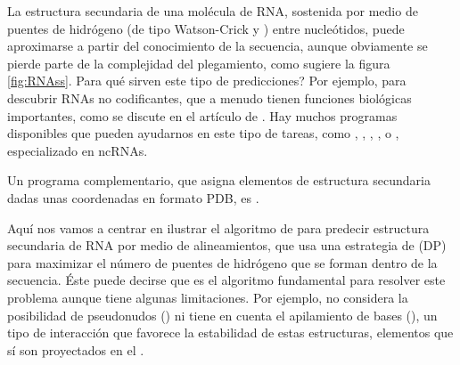 La estructura secundaria de una mol\'{e}cula de RNA, sostenida por medio de 
puentes de hidr\'{o}geno (de tipo Watson-Crick y
) entre nucle\'{o}tidos,
puede aproximarse a partir del conocimiento de la secuencia, aunque obviamente se pierde parte de la complejidad
del plegamiento, como sugiere la figura \ref{fig:RNAss}. Para qu\'{e} sirven este tipo de predicciones? 
Por ejemplo, para descubrir RNAs no codificantes, que a menudo tienen funciones biol\'{o}gicas importantes, 
como se discute en el art\'{i}culo de \cite{Washietl2005}.
Hay muchos programas disponibles que pueden ayudarnos en este tipo de tareas, como 
,
,
,
, 
 o
, especializado en ncRNAs.

Un programa complementario, que asigna elementos de estructura secundaria dadas unas coordenadas en formato PDB, es 
.

Aqu\'{i} nos vamos a centrar en ilustrar el algoritmo de \citet{Nussinov1978} para predecir estructura secundaria de RNA 
por medio de alineamientos, %
que usa una estrategia de 
 (DP)
para maximizar el n\'{u}mero de puentes de hidr\'{o}geno que se forman dentro de la secuencia. \'{E}ste puede decirse que es
el algoritmo fundamental para resolver este problema aunque tiene algunas limitaciones. Por ejemplo, no considera la posibilidad de 
pseudonudos () ni tiene en cuenta el 
apilamiento de bases (),
un tipo de interacci\'{o}n que favorece la estabilidad de estas estructuras, elementos que s\'{i} son proyectados en el
 \citep{dotu_ivan_2014_1066354}.

